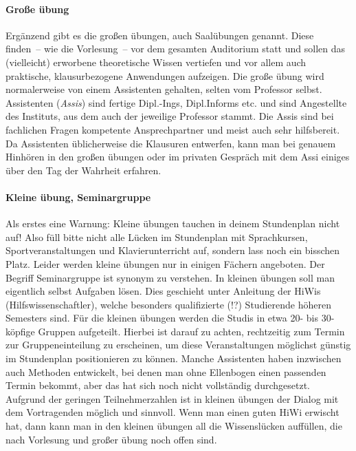 \begin{multicols}{2}
	\paragraph*{Große übung}
	Ergänzend gibt es die großen übungen, auch Saalübungen genannt. Diese finden~-- wie die Vorlesung~-- vor dem gesamten Auditorium statt und sollen das (vielleicht) erworbene theoretische Wissen vertiefen und vor allem auch praktische, klausurbezogene Anwendungen aufzeigen. Die große übung wird normalerweise von einem Assistenten gehalten, selten vom Professor selbst. Assistenten (\emph{Assis}) sind fertige Dipl.-Ings, Dipl.Informs etc. und sind Angestellte des Instituts, aus dem auch der jeweilige Professor stammt. Die Assis sind bei fachlichen Fragen kompetente Ansprechpartner und meist auch sehr hilfsbereit. Da Assistenten üblicherweise die Klausuren entwerfen, kann man bei genauem Hinhören in den großen übungen oder im privaten Gespräch mit dem Assi einiges über den Tag der Wahrheit erfahren.

	\paragraph*{Kleine übung, Seminargruppe}
	Als erstes eine Warnung: Kleine übungen tauchen in deinem Stundenplan nicht auf!
	Also füll bitte nicht alle Lücken im Stundenplan mit Sprachkursen, Sportveranstaltungen und Klavierunterricht auf, sondern lass noch ein bisschen Platz. Leider werden kleine übungen nur in einigen Fächern angeboten. Der Begriff Seminargruppe ist synonym zu verstehen.
	In kleinen übungen soll man eigentlich selbst Aufgaben lösen. Dies geschieht unter Anleitung der HiWis (Hilfswissenschaftler), welche besonders qualifizierte (!?) Studierende höheren Semesters sind. Für die kleinen übungen werden die Studis in etwa 20- bis 30-köpfige Gruppen aufgeteilt. Hierbei ist darauf zu achten, rechtzeitig zum Termin zur Gruppeneinteilung zu erscheinen, um diese Veranstaltungen möglichst günstig im Stundenplan positionieren zu können. Manche Assistenten haben inzwischen auch Methoden entwickelt, bei denen man ohne Ellenbogen einen passenden Termin bekommt, aber das hat sich noch nicht vollständig durchgesetzt. Aufgrund der geringen Teilnehmerzahlen ist in kleinen übungen der Dialog mit dem Vortragenden möglich und sinnvoll. Wenn man einen guten HiWi erwischt hat, dann kann man in den kleinen übungen all die Wissenslücken auffüllen, die nach Vorlesung und großer übung noch offen sind.
	

\end{multicols}
